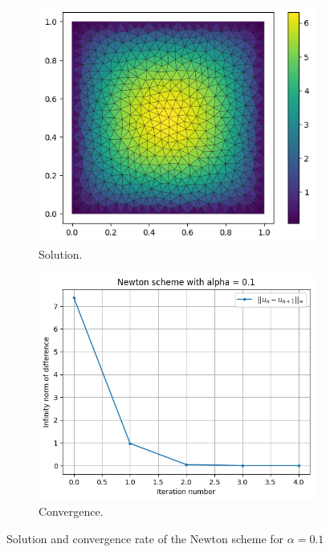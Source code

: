 \documentclass[11pt, a4paper, twoside]{article}
\begin{document}
\begin{figure}[H]
\begin{subfigure}[h]{0.5\linewidth}
\includegraphics[scale = 0.6]{../Figures/newt_sol_alpha0.1.png}
\caption{Solution.}
\label{q3fig1}
\end{subfigure}
\hfill
\begin{subfigure}[h]{0.5\linewidth}
\includegraphics[scale = 0.6]{../Figures/newt_conv_alpha0.1.png}
\caption{Convergence.}
\label{q3fig2}
\end{subfigure}%
\caption{Solution and convergence rate of the Newton scheme for $\alpha=0.1$}
\end{figure}
\end{document}
